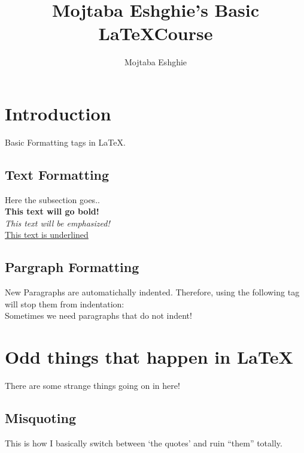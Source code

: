 \documentclass{article}
\title  {Mojtaba Eshghie's Basic \LaTeX  Course}
\author {Mojtaba Eshghie}
\date {}
\begin{document}
\maketitle

\section{Introduction}
Basic Formatting tags in \LaTeX. 

\subsection{Text Formatting}
Here the subsection goes.. \\
\textbf{This text will go bold!} \\
\emph{This text will be emphasized!} \\ 
\underline{This text is underlined} \\

\subsection{Pargraph Formatting}
New Paragraphs are automatichally indented. Therefore, using the following tag will stop them from indentation: \\
\noindent Sometimes we need paragraphs that do not indent!


\section {Odd things that happen in \LaTeX}
There are some strange things going on in here!

\subsection{Misquoting}
This is how I basically switch between `the quotes' and ruin ``them'' totally. %
\end{document}
